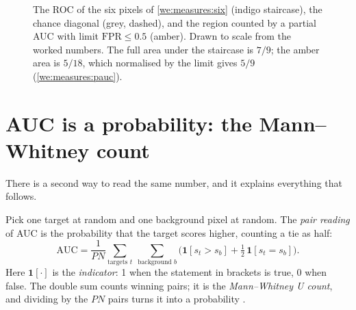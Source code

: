\begin{figure}[htbp]
\centering
{}
\caption{The ROC of the six pixels of \cref{we:measures:six} (indigo staircase), the chance diagonal (grey,
dashed), and the region counted by a partial AUC with limit $\mathrm{FPR} \le 0.5$ (amber). Drawn to scale from
the worked numbers. The full area under the staircase is $7/9$; the amber area is $5/18$, which normalised by the
limit gives $5/9$ (\cref{we:measures:pauc}).}
\label{fig:measures:sixroc}
\end{figure}

\section{AUC is a probability: the Mann--Whitney count}\label{sec:measures:mw}

There is a second way to read the same number, and it explains everything that follows.

\begin{definition}
Pick one target at random and one background pixel at random. The \emph{pair
reading} of AUC is the probability that the target scores higher, counting a tie as half:
\begin{equation}\label{eq:measures:mw}
\mathrm{AUC} = \frac{1}{PN}\sum_{\text{targets } t}\ \sum_{\text{background } b}
\Big(\mathbf{1}[s_t > s_b] + \tfrac12\,\mathbf{1}[s_t = s_b]\Big).
\end{equation}
Here $\mathbf{1}[\cdot]$ is the \emph{indicator}: 1 when the statement in brackets is true, 0 when false. The double
sum counts winning pairs; it is the \emph{Mann--Whitney U count}, and dividing by the $PN$ pairs turns it into a
probability \citep{hanley1982meaning}.
\end{definition}

